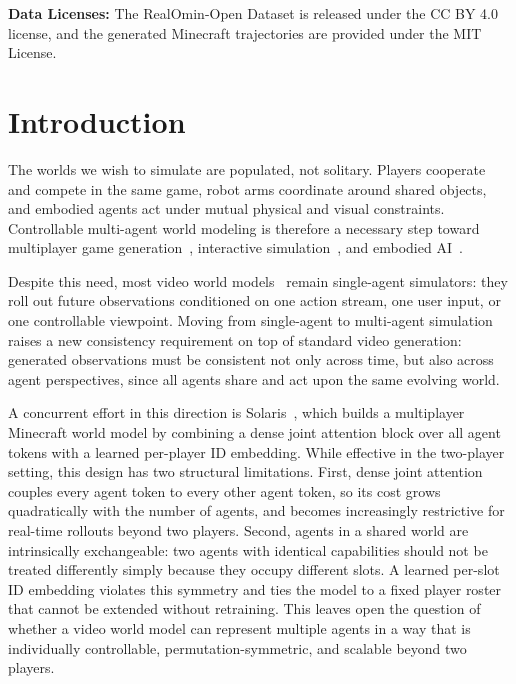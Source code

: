 \documentclass{llmxive}
\providecommand{\abscontent}{}
\begin{document}
\noindent\textbf{Data Licenses:} The RealOmin-Open Dataset is released under the CC BY 4.0 license, and the generated Minecraft trajectories are provided under the MIT License.

\abscontent

\section{Introduction}
\label{sec:introduction}

The worlds we wish to simulate are populated, not solitary.
Players cooperate and compete in the same game, robot arms coordinate around shared objects, and embodied agents act under mutual physical and visual constraints.
Controllable multi-agent world modeling is therefore a necessary step toward multiplayer game generation~\cite{bruce2024genie,savva2026solaris}, interactive simulation~\cite{ren2025cosmos-drive-dreams,ali2025world-simulation}, and embodied AI~\cite{fung2025embodied-ai-agents,feng2026multi-agent-embodied-ai}.

Despite this need, most video world models~\cite{alonso2024diffusion,valevski2024diffusion,he2025matrix,xiao2025worldmem,hyworld2025,worldplay2025,yu2025cam} remain single-agent simulators: they roll out future observations conditioned on one action stream, one user input, or one controllable viewpoint.
Moving from single-agent to multi-agent simulation raises a new consistency requirement on top of standard video generation: generated observations must be consistent not only across time, but also across agent perspectives, since all agents share and act upon the same evolving world.

A concurrent effort in this direction is Solaris~\cite{savva2026solaris}, which builds a multiplayer Minecraft world model by combining a dense joint attention block over all agent tokens with a learned per-player ID embedding.
While effective in the two-player setting, this design has two structural limitations.
First, dense joint attention couples every agent token to every other agent token, so its cost grows quadratically with the number of agents, and becomes increasingly restrictive for real-time rollouts beyond two players.
Second, agents in a shared world are intrinsically exchangeable: two agents with identical capabilities should not be treated differently simply because they occupy different slots.
A learned per-slot ID embedding violates this symmetry and ties the model to a fixed player roster that cannot be extended without retraining.
This leaves open the question of whether a video world model can represent multiple agents in a way that is individually controllable, permutation-symmetric, and scalable beyond two players.
\end{document}
